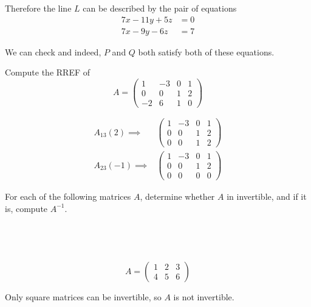 \documentclass[a4paper]{article}
\begin{document}
Therefore the line $L$ can be described by the pair of equations \begin{align*}
7x - 11y + 5z &= 0 \\
7x - 9y - 6z &= 7
\end{align*}

We can check and indeed, $P$ and $Q$ both satisfy both of these equations.


\begin{questionbody}
Compute the RREF of \[
A = \begin{pmatrix}
1 & -3 & 0 & 1 \\
0 & 0 & 1 & 2 \\
-2 & 6 & 1 & 0
\end{pmatrix}
\]
\end{questionbody}

\begin{align*}
A_{13}(2) \implies &\begin{pmatrix}
    1 & -3 & 0 & 1 \\
    0 & 0 & 1 & 2 \\
    0 & 0 & 1 & 2
\end{pmatrix} \\[1ex]
A_{23}(-1) \implies &\begin{pmatrix}
    1 & -3 & 0 & 1 \\
    0 & 0 & 1 & 2 \\
    0 & 0 & 0 & 0
\end{pmatrix}
\end{align*}


\begin{questionbody}
For each of the following matrices $A$, determine whether $A$ in invertible, and if it is, compute $A^{-1}$.
\end{questionbody}

\subsection{~} %

\begin{questionbody}
\[ A = \begin{pmatrix}1 & 2 & 3 \\ 4 & 5 & 6\end{pmatrix} \]
\end{questionbody}

Only square matrices can be invertible, so $A$ is not invertible.
\end{document}
